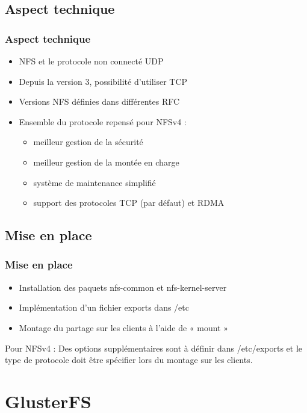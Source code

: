 \documentclass[blue]{beamer}
\begin{document}
\subsection{Aspect technique}
\begin{frame}
  \frametitle{Aspect technique}
  \begin{itemize}
    \item NFS et le protocole non connecté UDP
    \item Depuis la version 3, possibilité d'utiliser TCP
    \item Versions NFS définies dans différentes RFC
    \item Ensemble du protocole repensé pour NFSv4 :
    \begin{itemize}
      \item meilleur gestion de la sécurité
      \item meilleur gestion de la montée en charge
      \item système de maintenance simplifié
      \item support des protocoles TCP (par défaut) et RDMA
  \end{itemize}
  \end{itemize}
\end{frame}

\subsection{Mise en place}
	\begin{frame}
		\frametitle{Mise en place}
		\begin{itemize}
			\item Installation des paquets nfs-common et nfs-kernel-server
			\item Implémentation d'un fichier exports dans /etc
			\item Montage du partage sur les clients à l'aide de « mount »
		\end{itemize}
		\begin{block}{Pour NFSv4 :}
			Des options supplémentaires sont à définir dans /etc/exports et le type de protocole doit être spécifier lors du montage sur les clients.
		\end{block}
	\end{frame}
	
\section{GlusterFS}
\end{document}
